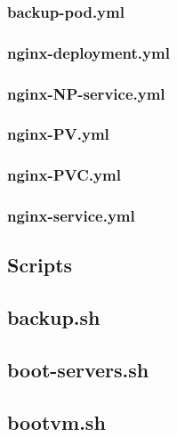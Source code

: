 \subsubsection{backup-pod.yml}
\noindent


\subsubsection{nginx-deployment.yml}


\subsubsection{nginx-NP-service.yml}


\subsubsection{nginx-PV.yml}


\subsubsection{nginx-PVC.yml}


\subsubsection{nginx-service.yml}


\subsection{Scripts}

\subsection{backup.sh}
\noindent


\subsection{boot-servers.sh}
\noindent


\subsection{bootvm.sh}
\noindent



